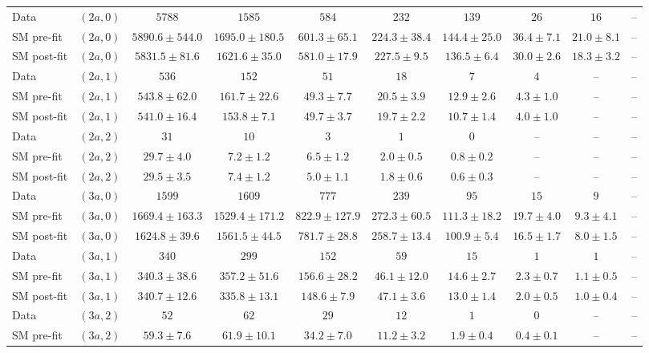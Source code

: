 \begin{table}[h!]
{\begin{tabular}{lccccccccc}
 Data & $(2a,0)$ & $5788$ & $1585$ & $584$ & $232$ & $139$ & $26$ & $16$ & -- \\[0.5ex]
 SM pre-fit & $(2a,0)$ & $5890.6\pm544.0$ & $1695.0\pm180.5$ & $601.3\pm65.1$ & $224.3\pm38.4$ & $144.4\pm25.0$ & $36.4\pm7.1$ & $21.0\pm8.1$ & -- \\[0.5ex]
 SM post-fit & $(2a,0)$ & $5831.5\pm81.6$ & $1621.6\pm35.0$ & $581.0\pm17.9$ & $227.5\pm9.5$ & $136.5\pm6.4$ & $30.0\pm2.6$ & $18.3\pm3.2$ & -- \\[0.5ex]
 Data & $(2a,1)$ & $536$ & $152$ & $51$ & $18$ & $7$ & $4$ & -- & -- \\[0.5ex]
 SM pre-fit & $(2a,1)$ & $543.8\pm62.0$ & $161.7\pm22.6$ & $49.3\pm7.7$ & $20.5\pm3.9$ & $12.9\pm2.6$ & $4.3\pm1.0$ & -- & -- \\[0.5ex]
 SM post-fit & $(2a,1)$ & $541.0\pm16.4$ & $153.8\pm7.1$ & $49.7\pm3.7$ & $19.7\pm2.2$ & $10.7\pm1.4$ & $4.0\pm1.0$ & -- & -- \\[0.5ex]
 Data & $(2a,2)$ & $31$ & $10$ & $3$ & $1$ & $0$ & -- & -- & -- \\[0.5ex]
 SM pre-fit & $(2a,2)$ & $29.7\pm4.0$ & $7.2\pm1.2$ & $6.5\pm1.2$ & $2.0\pm0.5$ & $0.8\pm0.2$ & -- & -- & -- \\[0.5ex]
 SM post-fit & $(2a,2)$ & $29.5\pm3.5$ & $7.4\pm1.2$ & $5.0\pm1.1$ & $1.8\pm0.6$ & $0.6\pm0.3$ & -- & -- & -- \\[0.5ex]
 Data & $(3a,0)$ & $1599$ & $1609$ & $777$ & $239$ & $95$ & $15$ & $9$ & -- \\[0.5ex]
 SM pre-fit & $(3a,0)$ & $1669.4\pm163.3$ & $1529.4\pm171.2$ & $822.9\pm127.9$ & $272.3\pm60.5$ & $111.3\pm18.2$ & $19.7\pm4.0$ & $9.3\pm4.1$ & -- \\[0.5ex]
 SM post-fit & $(3a,0)$ & $1624.8\pm39.6$ & $1561.5\pm44.5$ & $781.7\pm28.8$ & $258.7\pm13.4$ & $100.9\pm5.4$ & $16.5\pm1.7$ & $8.0\pm1.5$ & -- \\[0.5ex]
 Data & $(3a,1)$ & $340$ & $299$ & $152$ & $59$ & $15$ & $1$ & $1$ & -- \\[0.5ex]
 SM pre-fit & $(3a,1)$ & $340.3\pm38.6$ & $357.2\pm51.6$ & $156.6\pm28.2$ & $46.1\pm12.0$ & $14.6\pm2.7$ & $2.3\pm0.7$ & $1.1\pm0.5$ & -- \\[0.5ex]
 SM post-fit & $(3a,1)$ & $340.7\pm12.6$ & $335.8\pm13.1$ & $148.6\pm7.9$ & $47.1\pm3.6$ & $13.0\pm1.4$ & $2.0\pm0.5$ & $1.0\pm0.4$ & -- \\[0.5ex]
 Data & $(3a,2)$ & $52$ & $62$ & $29$ & $12$ & $1$ & $0$ & -- & -- \\[0.5ex]
 SM pre-fit & $(3a,2)$ & $59.3\pm7.6$ & $61.9\pm10.1$ & $34.2\pm7.0$ & $11.2\pm3.2$ & $1.9\pm0.4$ & $0.4\pm0.1$ & -- & -- \\[0.5ex]

\end{tabular}}
\end{table}
